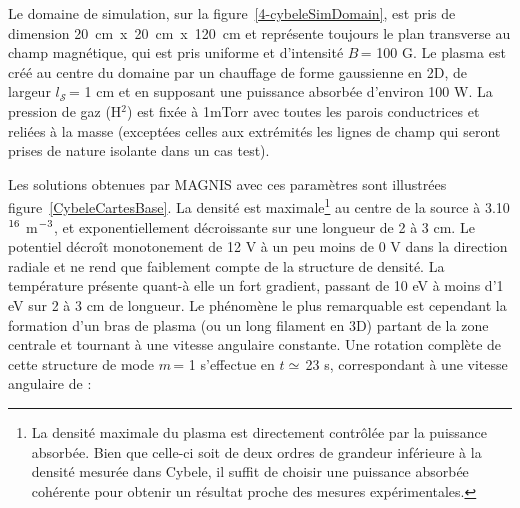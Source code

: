 \begin{refsection}
 Le domaine de
simulation, sur la figure~\ref{4-cybeleSimDomain}, est pris de dimension
20~cm~x~20~cm~x~120~cm et représente toujours le plan transverse au champ
magnétique, qui est pris uniforme et d'intensité $B\,$= 100 G. Le plasma est créé au centre du domaine par un chauffage de forme gaussienne en 2D, de largeur $l_\mathcal{S}\,$= 1 cm et en supposant une puissance absorbée
d'environ 100 W.
La pression de gaz (H$^2$) est fixée à 1mTorr avec toutes les parois
conductrices et reliées à la masse (exceptées celles aux extrémités les lignes
de champ qui seront prises de nature isolante dans un cas test).



Les solutions obtenues par MAGNIS avec ces paramètres sont illustrées
figure~\ref{CybeleCartesBase}. La densité est maximale\footnote{La
densité maximale du plasma est directement contrôlée par la puissance
absorbée. Bien que celle-ci soit de deux ordres de grandeur inférieure à la
densité mesurée dans Cybele, il suffit de choisir une puissance absorbée
cohérente pour obtenir un résultat proche des mesures expérimentales.} au centre
de la source à 3.10$^{{16}}$ m$^{{-3}}$, et
exponentiellement décroissante sur une longueur de 2 à 3 cm. Le potentiel
décroît monotonement de 12 V à un peu moins de 0 V dans la direction radiale et
ne rend que faiblement compte de la structure de densité.
 La température présente quant-à elle un fort gradient, passant de 10 eV à moins
 d'1 eV sur 2 à 3 cm de longueur. Le phénomène le plus
remarquable est cependant la formation d'un bras de plasma (ou un long filament
en 3D) partant de la zone centrale et tournant à une vitesse angulaire
constante.
Une rotation complète de cette structure de mode $m\,$= 1 s'effectue en
$t\simeq\,$23 \micro s, correspondant à une vitesse angulaire de :


\end{refsection}
